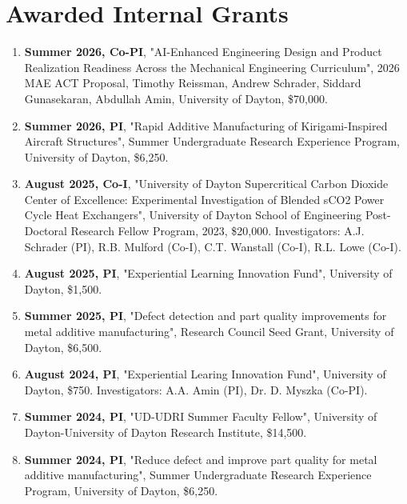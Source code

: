 \documentclass[11pt, letterpaper]{article}
\begin{document}
    \section{Awarded Internal Grants}
    \begin{enumerate}[label=\arabic*., itemsep=-1pt, topsep=2pt]
        \item \textbf{Summer 2026, Co-PI}, "AI-Enhanced Engineering Design and Product Realization Readiness Across the Mechanical Engineering Curriculum", 2026 MAE ACT Proposal, Timothy Reissman, Andrew Schrader, Siddard Gunasekaran, Abdullah Amin, University of Dayton, \$70,000.
        \item \textbf{Summer 2026, PI}, "Rapid Additive Manufacturing of Kirigami-Inspired Aircraft Structures", Summer Undergraduate Research Experience Program, University of Dayton, \$6,250.
        \item \textbf{August 2025, Co-I}, "University of Dayton Supercritical Carbon Dioxide Center of Excellence: Experimental Investigation of Blended sCO2 Power Cycle Heat Exchangers", University of Dayton School of Engineering Post-Doctoral Research Fellow Program, 2023, \$20,000. Investigators: A.J. Schrader (PI), R.B. Mulford (Co-I), C.T. Wanstall (Co-I), R.L. Lowe (Co-I).
        \item \textbf{August 2025, PI}, "Experiential Learning Innovation Fund", University of Dayton, \$1,500.
        \item \textbf{Summer 2025, PI}, "Defect detection and part quality improvements for metal additive manufacturing", Research Council Seed Grant, University of Dayton, \$6,500.
        \item \textbf{August 2024, PI}, "Experiential Learing Innovation Fund", University of Dayton, \$750. Investigators: A.A. Amin (PI), Dr. D. Myszka (Co-PI).
        \item \textbf{Summer 2024, PI}, "UD-UDRI Summer Faculty Fellow", University of Dayton-University of Dayton Research Institute, \$14,500.
        \item \textbf{Summer 2024, PI}, "Reduce defect and improve part quality for metal additive manufacturing", Summer Undergraduate Research Experience Program, University of Dayton, \$6,250.
    \end{enumerate}
\end{document}
